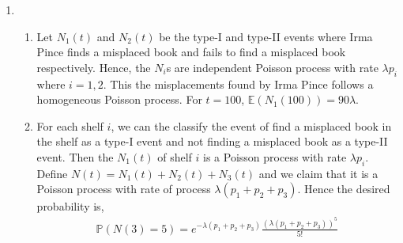 \documentclass[a4paper,10pt]{article}
\theoremstyle{definition}
\begin{document}
\begin{enumerate}
\item
\begin{enumerate}
\item Let $N_1(t)$ and $N_2(t)$ be the type-I and type-II events where Irma Pince finds a misplaced book and fails to find a misplaced book respectively. Hence, the $N_i$s are independent Poisson process with rate $\lambda p_i$ where $i=1,2$. This the misplacements found by Irma Pince follows a homogeneous Poisson process. For $t=100$, $\mathbb{E}(N_1(100))=90 \lambda$.
\item For each shelf $i$, we can the classify the event of find a misplaced book in the shelf as a type-I event and not finding a misplaced book as a type-II event. Then the $N_1(t)$ of shelf $i$ is a Poisson process with rate $\lambda p_i$. Define $N(t)=N_1(t)+N_2(t)+N_3(t)$ and we claim that it is a Poisson process with rate of process $\lambda(p_1+p_2+p_3)$. Hence the desired probability is,
\begin{align*}
\mathbb{P}(N(3)=5)=e^{-\lambda(p_1+p_2+p_3)}\frac{(\lambda(p_1+p_2+p_3))^5}{5!}
\end{align*}



\end{enumerate}
\end{enumerate}
\end{document}
